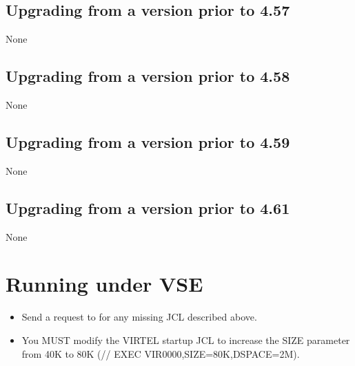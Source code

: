 \documentclass[letterpaper,10pt,english]{sphinxmanual}
\begin{document}
\ignorespaces 

\section{Upgrading from a version prior to 4.57}
\label{\detokenize{Migration_Guide:upgrading-from-a-version-prior-to-4-57}}\label{\detokenize{Migration_Guide:index-7}}
None


\section{Upgrading from a version prior to 4.58}
\label{\detokenize{Migration_Guide:upgrading-from-a-version-prior-to-4-58}}
None


\section{Upgrading from a version prior to 4.59}
\label{\detokenize{Migration_Guide:upgrading-from-a-version-prior-to-4-59}}
None


\section{Upgrading from a version prior to 4.61}
\label{\detokenize{Migration_Guide:upgrading-from-a-version-prior-to-4-60}}
None

\newpage

\ignorespaces 

\chapter{Running under VSE}
\label{\detokenize{Migration_Guide:running-under-vse}}\label{\detokenize{Migration_Guide:index-8}}\begin{itemize}
\item {} 
Send a request to  for any missing JCL described above.

\item {} 
You MUST modify the VIRTEL startup JCL to increase the SIZE parameter from 40K to 80K (// EXEC VIR0000,SIZE=80K,DSPACE=2M).

\end{itemize}
\end{document}
